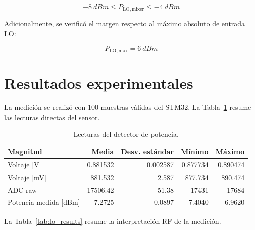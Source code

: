 \documentclass[12pt,a4paper]{article}
\begin{document}
\begin{equation}
\SI{-8}{dBm} \leq P_{\mathrm{LO,mixer}} \leq \SI{-4}{dBm}
\end{equation}

Adicionalmente, se verificó el margen respecto al máximo absoluto de entrada LO:

\begin{equation}
P_{\mathrm{LO,max}} = \SI{6}{dBm}
\end{equation}

\section{Resultados experimentales}

La medición se realizó con 100 muestras válidas del STM32. La Tabla~\ref{tab:meas_results} resume las lecturas directas del sensor.

\begin{table}[H]
\centering
\caption{Lecturas del detector de potencia.}
\label{tab:meas_results}
\begin{tabular}{lrrrr}
\toprule
\textbf{Magnitud} & \textbf{Media} & \textbf{Desv. estándar} & \textbf{Mínimo} & \textbf{Máximo} \\
\midrule
Voltaje [V] &
0.881532 & 0.002587 & 0.877734 & 0.890474 \\
Voltaje [mV] &
881.532 & 2.587 & 877.734 & 890.474 \\
ADC raw &
17506.42 & 51.38 & 17431 & 17684 \\
Potencia medida [dBm] &
-7.2725 & 0.0897 & -7.4040 & -6.9620 \\
\bottomrule
\end{tabular}
\end{table}

La Tabla~\ref{tab:lo_results} resume la interpretación RF de la medición.
\end{document}
